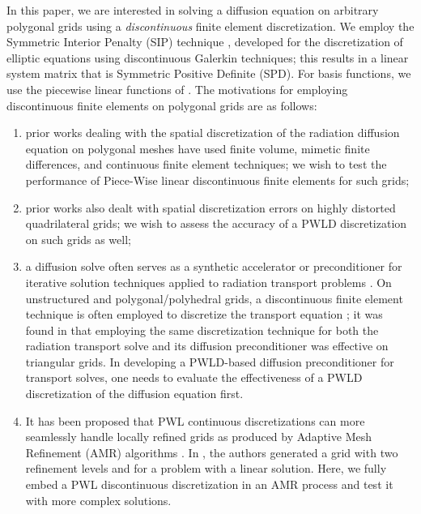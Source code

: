 \documentclass[preprint,10pt]{elsarticle}
\begin{document}
In this paper, we are interested in solving a diffusion equation on arbitrary polygonal
grids using a {\em discontinuous} finite element discretization. We employ the
Symmetric Interior Penalty (SIP) technique \cite{Arnold1982,DouglasN.Arnold2002,Kanschat2007}, 
developed for the discretization of elliptic equations using discontinuous Galerkin techniques;
this results in a linear system matrix that is Symmetric Positive Definite (SPD). For basis functions,
we use the piecewise linear functions of \cite{BaileyAdams2008}.
The motivations for employing discontinuous finite elements on polygonal grids are as follows: 
\begin{enumerate}
\item 
	prior works dealing with the spatial discretization of the radiation diffusion equation on polygonal meshes 
	have used finite volume, mimetic finite differences, and continuous finite element techniques;  
	we wish to test the performance of Piece-Wise linear discontinuous finite elements for such grids;
\item prior works also dealt with spatial discretization errors on highly distorted quadrilateral grids; 
  we wish to assess the accuracy of a PWLD discretization on such grids as well; 
\item a diffusion solve often serves as a synthetic accelerator or preconditioner for 
  iterative solution techniques applied to radiation transport problems
	\cite{AdamsLarsen2002,JamesS.Warsa2004}. On unstructured and polygonal/polyhedral grids,
	a discontinuous finite element technique is often employed to discretize the transport equation 
	\cite{Wareing_McGhee_Morel_Pautz_DGFEM2001,Warsa2008_CDFEM,Ragusa_Wang_NSE_2009,Bailey_MC2011,Ragusa_Wang_JCP_2011};
	it was found in \cite{Ragusa_Wang_NSE_2010} that employing the same discretization technique for both 
	the radiation transport solve and its diffusion preconditioner was effective on triangular grids.
	In developing a PWLD-based diffusion preconditioner for transport solves, one needs to 
	evaluate the effectiveness of a PWLD discretization of the diffusion equation first.  
\item It has been proposed that PWL continuous discretizations can
  more seamlessly handle locally refined grids as produced by Adaptive Mesh Refinement (AMR) algorithms
	\cite{BaileyAdams2008}. In \cite{BaileyAdams2008}, the authors generated a grid with two refinement levels
	and for a problem with a linear solution. Here, we fully embed a PWL discontinuous discretization
	in an AMR process and test it with more complex solutions.
\end{enumerate}
\end{document}
